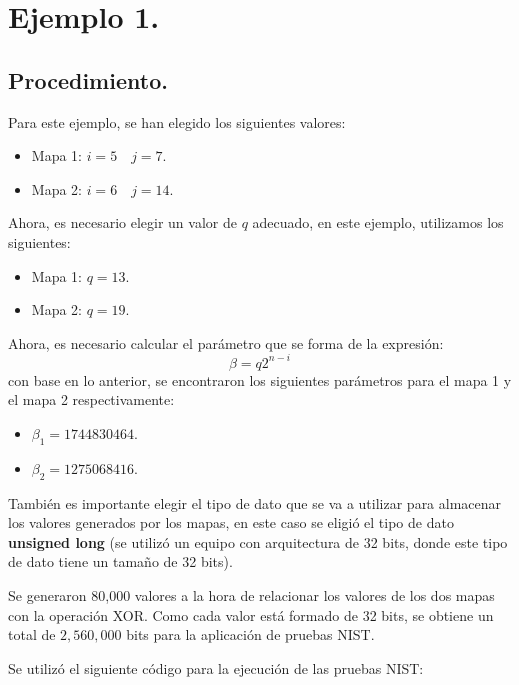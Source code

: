\documentclass[10pt]{IEEEtran}
\begin{document}
\section{Ejemplo 1.}

\subsection{Procedimiento.}
Para este ejemplo, se han elegido los siguientes valores:

\begin{itemize}
\item Mapa 1: $i  = 5 \quad j = 7$.


\item Mapa 2: $i = 6 \quad j = 14$.
\end{itemize}

Ahora, es necesario elegir un valor de $q$ adecuado, en este ejemplo, utilizamos los siguientes:

\begin{itemize}
\item Mapa 1: $q = 13.$
\item Mapa 2: $q = 19.$
\end{itemize}


Ahora, es necesario calcular el parámetro que se forma de la expresión:  
\begin{equation}
\beta = q 2^{n-i}
\end{equation}
con base en lo anterior, se encontraron los siguientes parámetros para el mapa 1 y el mapa 2 respectivamente:

\begin{itemize}
\item $\beta_{1}=1744830464$.
\item $\beta_{2}=1275068416$.
\end{itemize}


 
También es importante elegir el tipo de dato que se va a utilizar para almacenar los valores generados por los mapas, en este caso se eligió el tipo de dato \textbf{unsigned long} (se utilizó un equipo con arquitectura de 32 bits, donde este tipo de dato tiene un tamaño de 32 bits).

Se generaron 80,000 valores  a la hora de relacionar los valores de los dos mapas con la operación XOR. Como cada valor está formado de 32 bits, se  obtiene un total de $2,560,000$ bits para la aplicación de pruebas NIST.



Se utilizó el siguiente código para la ejecución de las pruebas NIST:
\end{document}
